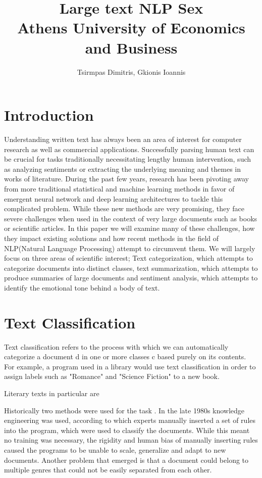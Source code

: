 \documentclass{article}
\title{Large text NLP Sex\\\large Athens University of Economics and Business}
\author{Tsirmpas Dimitris, Gkionis Ioannis}
\begin{document}
	
	\begin{titlepage}
		\hypersetup{pageanchor=false} %
		\maketitle
	\end{titlepage}
	\hypersetup{pageanchor=true}
	
	\section{Introduction}
	Understanding written text has always been an area of interest for computer research as well as commercial applications. Successfully parsing human text can be crucial for tasks traditionally necessitating lengthy human intervention, such as analyzing sentiments or extracting the underlying meaning and themes in works of literature. During the past few years, research has been pivoting away from more traditional statistical and machine learning methods in favor of emergent neural network and deep learning architectures to tackle this complicated problem. While these new methods are very promising, they face severe challenges when used in the context of very large documents such as books or scientific articles. In this paper we will examine many of these challenges, how they impact existing solutions and how recent methods in the field of NLP(Natural Language Processing) attempt to circumvent them. We will largely focus on three areas of scientific interest; Text categorization, which attempts to categorize documents into distinct classes, text summarization, which attempts to produce summaries of large documents and sentiment analysis, which attempts to identify the emotional tone behind a body of text. 
	
	\section{Text Classification}
	Text classification refers to the process with which we can automatically categorize a document d in one or more classes c based purely on its contents. For example, a program used in a library would use text classification in order to assign labels such as "Romance" and "Science Fiction" to a new book.\par
	
	
	Literary texts in particular are 
	
	Historically two methods were used for the task \cite{rami}. 
	In the late 1980s knowledge engineering was used, according to which experts manually inserted a set of rules into the program, which were used to classify the documents. While this meant no training was necessary, the rigidity and human bias of manually inserting rules caused the programs to be unable to scale, generalize and adapt to new documents. Another problem that emerged is that a document could belong to multiple genres that could not be easily separated from each other.\par
	
\end{document}
